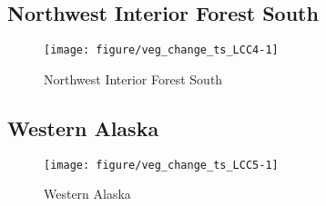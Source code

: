 \documentclass{article}\usepackage[]{graphicx}\usepackage[]{color}
\makeatletter
\def\maxwidth{ %
  \ifdim\Gin@nat@width>\linewidth
    \linewidth
  \else
    \Gin@nat@width
  \fi
}
\makeatother
\begin{document}
\subsection{Northwest Interior Forest South}
\begin{figure}[H]
\texttt{[image: figure/veg\_change\_ts\_LCC4-1]} \caption[Northwest Interior Forest South]{Northwest Interior Forest South\label{fig:veg_change_ts_LCC4}}
\end{figure}



\subsection{Western Alaska}
\begin{figure}[H]
\texttt{[image: figure/veg\_change\_ts\_LCC5-1]} \caption[Western Alaska]{Western Alaska\label{fig:veg_change_ts_LCC5}}
\end{figure}
\end{document}
